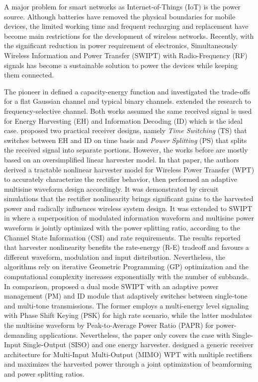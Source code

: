 A major problem for smart networks as Internet-of-Things (IoT) is the power source. Although batteries have removed the physical boundaries for mobile devices, the limited working time and frequent recharging and replacement have become main restrictions for the development of wireless networks. Recently, with the significant reduction in power requirement of electronics, Simultaneously Wireless Information and Power Transfer (SWIPT) with Radio-Frequency (RF) signals has become a sustainable solution to power the devices while keeping them connected.

The pioneer in \cite{R.Varshney2008} defined a capacity-energy function and investigated the trade-offs for a flat Gaussian channel and typical binary channels. \cite{Grover2010} extended the research to frequency-selective channel. Both works assumed the same received signal is used for Energy Harvesting (EH) and Information Decoding (ID) which is the ideal case. \cite{Zhang2013} proposed two practical receiver designs, namely \textit{Time Switching} (TS) that switches between EH and ID on time basis and \textit{Power Splitting} (PS) that splits the received signal into separate portions. However, the works before \cite{Clerckx2016} are mostly based on an oversimplified linear harvester model. In that paper, the authors derived a tractable nonlinear harvester model for Wireless Power Transfer (WPT) to accurately characterize the rectifier behavior, then performed an adaptive multisine waveform design accordingly. It was demonstrated by circuit simulations that the rectifier nonlinearity brings significant gains to the harvested power and radically influences wireless system design. It was extended to SWIPT in \cite{Clerckx2018} where a superposition of modulated information waveform and multisine power waveform is jointly optimized with the power splitting ratio, according to the Channel State Information (CSI) and rate requirements. The results reported that harvester nonlinearity benefits the rate-energy (R-E) tradeoff and favours a different waveform, modulation and input distribution. Nevertheless, the algorithms rely on iterative Geometric Programming (GP) optimization and the computational complexity increases exponentially with the number of subbands. In comparison, \cite{Park2018} proposed a dual mode SWIPT with an adaptive power management (PM) and ID module that adaptively switches between single-tone and multi-tone transmissions. The former employs a multi-energy level signaling with Phase Shift Keying (PSK) for high rate scenario, while the latter modulates the multisine waveform by Peak-to-Average Power Ratio (PAPR) \cite{Krikidis2019} for power-demanding applications. Nevertheless, the paper only covers the case with Single-Input Single-Output (SISO) and one energy harvester. \cite{Ma2019} designed a generic receiver architecture for Multi-Input Multi-Output (MIMO) WPT with multiple rectifiers and maximizes the harvested power through a joint optimization of beamforming and power splitting ratios.

